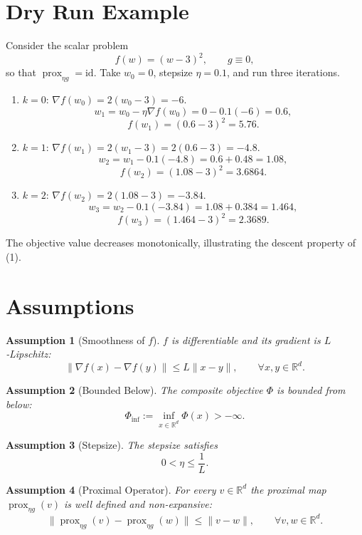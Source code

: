 \documentclass{article}
\newtheorem{assumption}{Assumption}
\begin{document}
\section*{Dry Run Example}
Consider the scalar problem 
\[
f(w)=(w-3)^{2},\qquad g\equiv0,
\]
so that $\operatorname{prox}_{\eta g}= \text{id}$.  
Take $w_{0}=0$, stepsize $\eta=0.1$, and run three iterations.

\begin{enumerate}[nosep]
\item $k=0$: $\nabla f(w_{0})=2(w_{0}-3)=-6$.
\[
w_{1}=w_{0}-\eta\nabla f(w_{0})=0-0.1(-6)=0.6,
\]
\[
f(w_{1})=(0.6-3)^{2}=5.76.
\]

\item $k=1$: $\nabla f(w_{1})=2(w_{1}-3)=2(0.6-3)=-4.8$.
\[
w_{2}=w_{1}-0.1(-4.8)=0.6+0.48=1.08,
\]
\[
f(w_{2})=(1.08-3)^{2}=3.6864.
\]

\item $k=2$: $\nabla f(w_{2})=2(1.08-3)=-3.84$.
\[
w_{3}=w_{2}-0.1(-3.84)=1.08+0.384=1.464,
\]
\[
f(w_{3})=(1.464-3)^{2}=2.3689.
\]
\end{enumerate}
The objective value decreases monotonically, illustrating the descent property of (1).

\newpage
\section*{Assumptions}
\begin{assumption}[Smoothness of $f$]\label{asm:smooth}
$f$ is differentiable and its gradient is $L$‑Lipschitz:
\[
\|\nabla f(x)-\nabla f(y)\|\le L\|x-y\|,\qquad\forall x,y\in\mathbb{R}^{d}.
\]
\end{assumption}
\begin{assumption}[Bounded Below]\label{asm:bounded}
The composite objective $\Phi$ is bounded from below:
\[
\Phi_{\inf}:=\inf_{x\in\mathbb{R}^{d}}\Phi(x)>-\infty .
\]
\end{assumption}
\begin{assumption}[Stepsize]\label{asm:stepsize}
The stepsize satisfies
\[
0<\eta\le \frac{1}{L}.
\]
\end{assumption}
\begin{assumption}[Proximal Operator]\label{asm:prox}
For every $v\in\mathbb{R}^{d}$ the proximal map $\operatorname{prox}_{\eta g}(v)$ is well defined and \emph{non‑expansive}:
\[
\big\|\operatorname{prox}_{\eta g}(v)-\operatorname{prox}_{\eta g}(w)\big\|
\le\|v-w\|,\qquad\forall v,w\in\mathbb{R}^{d}.
\]
\end{assumption}
\end{document}
